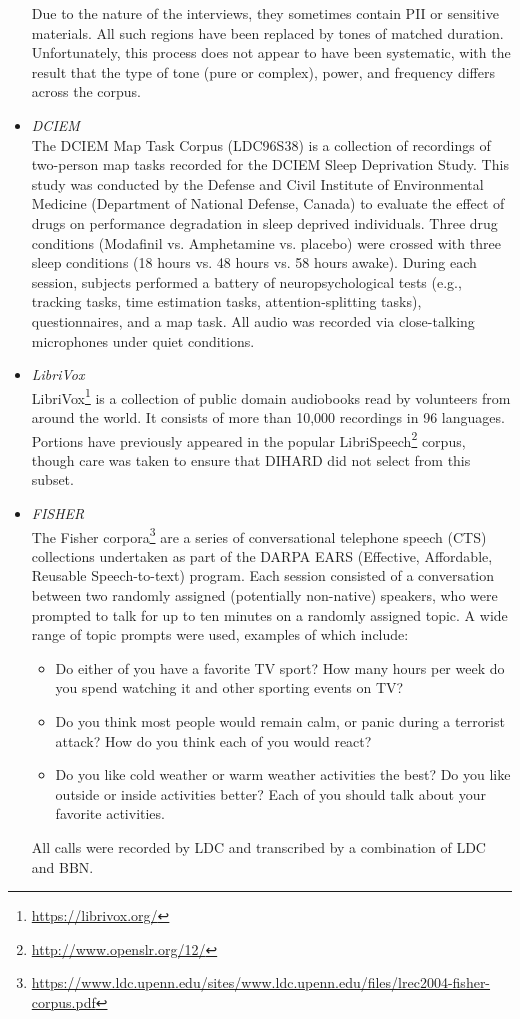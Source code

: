 \documentclass{article}
\begin{document}
\begin{appendices}
\begin{itemize}
            Due to the nature of the interviews, they sometimes contain PII or sensitive materials. All such regions have been replaced by tones of matched duration. Unfortunately, this process does not appear to have been systematic, with the result that the type of tone (pure or complex), power, and frequency differs across the corpus.
        \item {\it DCIEM} \\
            The DCIEM Map Task Corpus (LDC96S38) is a collection of recordings of two-person map tasks recorded for the DCIEM Sleep Deprivation Study. This study was conducted by the Defense and Civil Institute of Environmental  Medicine  (Department  of National  Defense,  Canada) to evaluate the effect of drugs on performance degradation in sleep deprived individuals. Three drug conditions (Modafinil vs. Amphetamine vs. placebo) were crossed with three sleep conditions (18 hours vs. 48 hours vs. 58 hours awake). During each session, subjects performed a battery of neuropsychological tests (e.g., tracking tasks, time estimation tasks, attention-splitting tasks), questionnaires, and a map task. All audio was recorded via close-talking microphones under quiet conditions.
        \item {\it LibriVox} \\
            LibriVox\footnote{\url{https://librivox.org/}} is a collection of public domain audiobooks read by volunteers from around the world. It consists of more than 10,000 recordings in 96 languages. Portions have previously appeared in the popular LibriSpeech\footnote{\url{http://www.openslr.org/12/}} corpus, though care was taken to ensure that DIHARD did not select from this subset.
        \item {\it FISHER} \\
            The Fisher corpora\footnote{\url{https://www.ldc.upenn.edu/sites/www.ldc.upenn.edu/files/lrec2004-fisher-corpus.pdf}} are a series of conversational telephone speech (CTS) collections undertaken as part of the DARPA EARS (Effective, Affordable, Reusable Speech-to-text) program. Each session consisted of a conversation between two randomly assigned (potentially non-native) speakers, who were prompted to talk for up to ten minutes on a randomly assigned topic. A wide range of topic prompts were used, examples of which include:
                \begin{itemize}
                    \item Do either of you have a favorite TV sport? How many hours per week do you spend watching it and other sporting events on TV?
                    \item Do you think most people would remain calm, or panic during a terrorist attack? How do you think each of you would react?
                    \item Do you like cold weather or warm weather activities the best? Do you like outside or inside activities better? Each of you should talk about your favorite activities.
                \end{itemize}
            All calls were recorded by LDC and transcribed by a combination of LDC and BBN.


\end{itemize}
\end{appendices}
\end{document}
